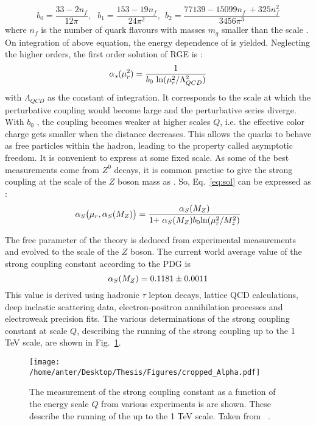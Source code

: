 \begin{equation}
b_0 = \frac{33-2n_f}{12\pi}, ~~~b_1 = \frac{153-19n_f}{24\pi^2}, ~~b_2 = \frac{77139 - 15099n_f~\plus 325n^2_f}{3456\pi^3}
\end{equation}
where $n_f$ is the number of quark flavours with masses $m_q$ smaller than the scale \mur. On integration of above equation, the energy dependence of \alps is yielded. Neglecting the higher orders, the first order solution of RGE is :
\begin{equation}
\alpha_{s}(\mur^2)=\frac{1}{b_0~{\rm ln}(\mur^2/\Lambda^2_{QCD})}
\label{eq:sol}
\end{equation}
with $\Lambda_{QCD}$ as the constant of integration. It corresponds to the scale at which the perturbative coupling would become large and the perturbative series diverge. With $b_0$ , the coupling becomes weaker at higher scales $Q$, i.e. the effective color charge gets smaller when the distance decreases. This allows the quarks to behave as free particles within the hadron, leading to the property called asymptotic freedom. It is convenient to express \alps at some fixed scale. As some of the best measurements come from $Z^0$ decays, it is common practise to give the strong coupling at the scale of the $Z$ boson mass as \alpsmz. So, Eq.~\ref{eq:sol} can be expressed as :
\begin{equation}
\alps\big(\mur,\alpsmz\big) = \frac{\alpsmz}{1\plus\alpsmz b_0{\rm ln}(\mur^2/M^2_z)}
\end{equation}

The free parameter \alps of the theory is deduced from experimental measurements and evolved to the scale of the $Z$ boson. The current world average value of the strong coupling constant according to the PDG \cite{Patrignani:2016xqp} is 
\begin{equation}
\alpha_S(M_Z) = 0.1181 \pm 0.0011
\end{equation}
This value is derived using hadronic $\tau$ lepton decays, lattice QCD calculations, deep inelastic scattering data, electron-positron annihilation processes and electroweak precision fits. The various determinations of the strong coupling constant at scale $Q$, describing the running of the strong coupling up to the 1 TeV scale, are shown in Fig.~\ref{fig:alpha_pdg}.

\begin{figure}[!h]
\begin{center}
\hspace*{-7mm}
\texttt{[image: /home/anter/Desktop/Thesis/Figures/cropped\_Alpha.pdf]}\\
\vspace*{4mm}
\caption[Running of the strong coupling constant.]{The measurement of the strong coupling constant \alps as a function of the energy scale $Q$ from various experiments is are shown. These describe the running of the \alps up to the 1 TeV scale. Taken from ~\cite{Patrignani:2016xqp}.}
\label{fig:alpha_pdg}
\end{center}
\end{figure}

